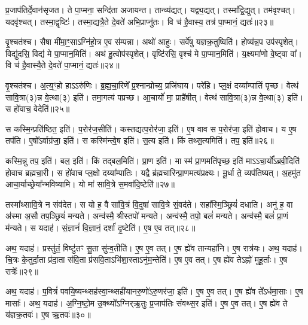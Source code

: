    प्र॒जाप॑तिर्दे॒वान॑सृजत।
   ते पा॒प्मना॒ सन्दि॑ता अजायन्त।
   तान्व्य॑द्यत्।
   यद्व्य॒द्यत्।
   तस्मा᳚द्वि॒द्युत्।
   तम॑वृश्चत्।
   यदवृ॑श्चत्।
   तस्मा॒द्वृष्टिः॑।
   तस्मा॒द्यत्रै॒ते दे॒वते॑ अभि॒प्राप्नु॑तः।
   वि च॑ है॒वास्य॒ तत्र॑ पा॒प्मानं॒ द्यतः॑॥२३॥

   वृ॒श्चत॑श्च।
   सैषा मी॑मा॒ꣳ॒साऽग्नि॑हो॒त्र ए॒व स॑म्पन्ना।
   अथो॑ आहुः।
   सर्वे॑षु यज्ञक्र॒तुष्विति॑।
   होष्य॑न्न॒प उप॑स्पृशेत्।
   विद्यु॑दसि॒ विद्य॑ मे पा॒प्मान॒मिति॑।
   अथ॑ हु॒त्वोप॑स्पृशेत्।
   वृष्टि॑रसि॒ वृश्च॑ मे पा॒प्मान॒मिति॑।
   य॒क्ष्यमा॑णो वे॒ष्ट्वा वा᳚।
   वि च॑ है॒वास्यै॒ते दे॒वते॑ पा॒प्मानं॒ द्यतः॑॥२४॥

   वृ॒श्चत॑श्च।
   अ॒त्य॒ꣳ॒हो हाऽऽरु॑णिः।
   ब्र॒ह्म॒चा॒रिणे᳚ प्र॒श्नान्प्रोच्य॒ प्रजि॑घाय।
   परे॑हि।
   प्ल॒क्षं दय्या᳚म्पातिं पृच्छ।
   वेत्थ॑ सावि॒त्रा(३)न्न वे॒त्था(३) इति॑।
   तमा॒गत्य॑ पप्रच्छ।
   आ॒चार्यो॑ मा॒ प्राहै॑षीत्।
   वेत्थ॑ सावि॒त्रा(३)न्न वे॒त्था(३) इति॑।
   स हो॑वाच॒ वेदेति॑॥२५॥

   स कस्मि॒न्प्रति॑ष्ठित॒ इति॑।
   प॒रोर॑ज॒सीति॑।
   कस्तद्यत्प॒रोर॑जा॒ इति॑।
   ए॒ष वाव स प॒रोर॑जा॒ इति॑ होवाच।
   य ए॒ष तप॑ति।
   ए॒षो᳚ऽर्वाग्र॑जा॒ इति॑।
   स कस्मि॑न्त्वे॒ष इति॑।
   स॒त्य इति॑।
   किं तथ्स॒त्यमिति॑।
   तप॒ इति॑॥२६॥

   कस्मि॒न्नु तप॒ इति॑।
   बल॒ इति॑।
   किं तद्बल॒मिति॑।
   प्रा॒ण इति॑।
   मा स्म॑ प्रा॒णमति॑पृच्छ॒ इति॑ माऽऽचा॒र्यो᳚ऽब्रवी॒दिति॑ होवाच ब्रह्मचा॒री।
   स हो॑वाच प्ल॒क्षो दय्या᳚म्पातिः।
   यद्वै ब्र॑ह्मचारिन्प्रा॒णमत्य॑प्रक्ष्यः।
   मू॒र्धा ते॒ व्यप॑तिष्यत्।
   अ॒हमु॑त आचा॒र्याच्छ्रेया᳚न्भविष्यामि।
   यो मा॑ सावि॒त्रे स॒मवा॑दि॒ष्टेति॑॥२७॥

   तस्मा᳚थ्सावि॒त्रे न संव॑देत।
   स यो ह॒ वै सा॑वि॒त्रं वि॒दुषा॑ सावि॒त्रे सं॒वद॑ते।
   सहा᳚स्मि॒ञ्छ्रियं॑ दधाति।
   अनु॑ ह॒ वा अ॑स्मा अ॒सौ तप॒ञ्छ्रियं॑ मन्यते।
   अन्व॑स्मै॒ श्रीस्तपो॑ मन्यते।
   अन्व॑स्मै॒ तपो॒ बलं॑ मन्यते।
   अन्व॑स्मै॒ बलं॑ प्रा॒णं म॑न्यते।
   स यदाह॑।
   सं॒ज्ञानं॑ वि॒ज्ञानं॒ दर्\mbox{}शा॑ दृ॒ष्टेति॑।
   ए॒ष ए॒व तत्॥२८॥

   अथ॒ यदाह॑।
   प्रस्तु॑तं॒ विष्टु॑तꣳ सु॒ता सु॑न्व॒तीति॑।
   ए॒ष ए॒व तत्।
   ए॒ष ह्ये॑व तान्यहा॑नि।
   ए॒ष रात्र॑यः।
   अथ॒ यदाह॑।
   चि॒त्रः के॒तुर्दा॒ता प्र॑दा॒ता स॑वि॒ता प्र॑सवि॒ताऽभि॑शा॒स्ताऽनु॑म॒न्तेति॑।
   ए॒ष ए॒व तत्।
   ए॒ष ह्ये॑व तेऽह्नो॑ मुहू॒र्ताः।
   ए॒ष रात्रेः᳚॥२९॥

   अथ॒ यदाह॑।
   प॒वित्रं॑ पवयि॒ष्यन्थ्सह॑स्वा॒न्थ्सही॑यानरु॒णो॑\-ऽरु॒णर॑जा॒ इति॑।
   ए॒ष ए॒व तत्।
   ए॒ष ह्ये॑व ते᳚ऽर्धमा॒साः।
   ए॒ष मासाः᳚।
   अथ॒ यदाह॑।
   अ॒ग्नि॒ष्टो॒म उ॒क्थ्यो᳚ऽग्निर्{‌}ऋ॒तुः प्र॒जाप॑तिः संवथ्स॒र इति॑।
   ए॒ष ए॒व तत्।
   ए॒ष ह्ये॑व ते य॑ज्ञक्र॒तवः॑।
   ए॒ष ऋ॒तवः॑॥३०॥

